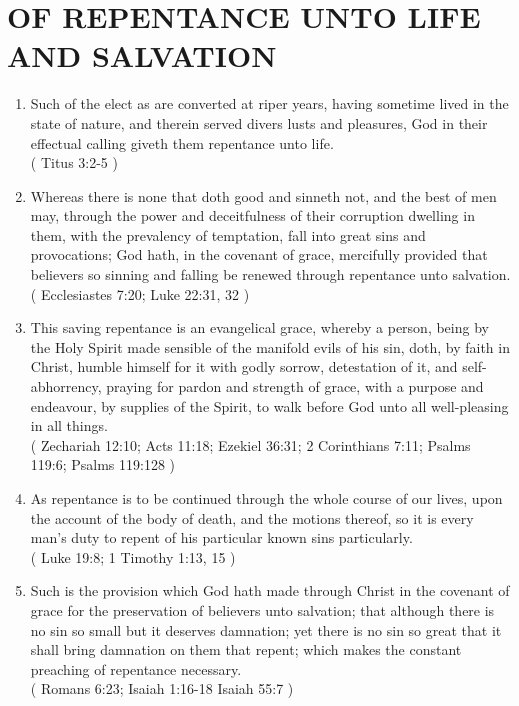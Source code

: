 \documentclass[12pt,a4paper]{book}
\begin{document}
\chapter{OF REPENTANCE UNTO LIFE AND SALVATION}
\label{ch-rep-sal}
\begin{enumerate}
\item
\label{ch-rep-sal-1}
Such of the elect as are converted at riper years, having sometime lived in the state of nature, and therein served divers lusts and pleasures, God in their effectual calling giveth them repentance unto life.\\
( Titus 3:2-5 )
\item
\label{ch-rep-sal-2}
Whereas there is none that doth good and sinneth not, and the best of men may, through the power and deceitfulness of their corruption dwelling in them, with the prevalency of temptation, fall into great sins and provocations; God hath, in the covenant of grace, mercifully provided that believers so sinning and falling be renewed through repentance unto salvation.\\
( Ecclesiastes 7:20; Luke 22:31, 32 )
\item
\label{ch-rep-sal-3}
This saving repentance is an evangelical grace, whereby a person, being by the Holy Spirit made sensible of the manifold evils of his sin, doth, by faith in Christ, humble himself for it with godly sorrow, detestation of it, and self-abhorrency, praying for pardon and strength of grace, with a purpose and endeavour, by supplies of the Spirit, to walk before God unto all well-pleasing in all things.\\
( Zechariah 12:10; Acts 11:18; Ezekiel 36:31; 2 Corinthians 7:11; Psalms 119:6; Psalms 119:128 )
\item
\label{ch-rep-sal-4}
As repentance is to be continued through the whole course of our lives, upon the account of the body of death, and the motions thereof, so it is every man's duty to repent of his particular known sins particularly.\\
( Luke 19:8; 1 Timothy 1:13, 15 )
\item
\label{ch-rep-sal-5}
Such is the provision which God hath made through Christ in the covenant of grace for the preservation of believers unto salvation; that although there is no sin so small but it deserves damnation; yet there is no sin so great that it shall bring damnation on them that repent; which makes the constant preaching of repentance necessary.\\
( Romans 6:23; Isaiah 1:16-18 Isaiah 55:7 )
\end{enumerate}
\end{document}
